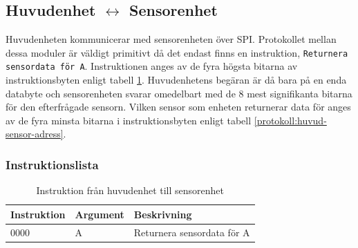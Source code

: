 \subsection{Huvudenhet $\longleftrightarrow$ Sensorenhet} \label{protokoll-huvud-sensor}

Huvudenheten kommunicerar med sensorenheten över SPI. Protokollet mellan dessa moduler är väldigt primitivt då det endast finns en instruktion, \texttt{Returnera sensordata för A}. Instruktionen anges av de fyra högsta bitarna av instruktionsbyten enligt tabell \ref{protokoll:huvud-sensor}. Huvudenhetens begäran är då bara på en enda databyte och sensorenheten svarar omedelbart med de 8 mest signifikanta bitarna för den efterfrågade sensorn. Vilken sensor som enheten returnerar data för anges av de fyra minsta bitarna i instruktionsbyten enligt tabell \ref{protokoll:huvud-sensor-adress}.

\subsubsection{Instruktionslista}

\begin{table}[h!]
	\centering
	\begin{tabularx}{\textwidth}{| l | l | X |}
		\hline
		\textbf{Instruktion} & \textbf{Argument} & \textbf{Beskrivning} \\\hline
		{0000} & {A} & {Returnera sensordata för A} \\\hline
	\end{tabularx}
	\caption{Instruktion från huvudenhet till sensorenhet} \label{protokoll:huvud-sensor}
\end{table}

